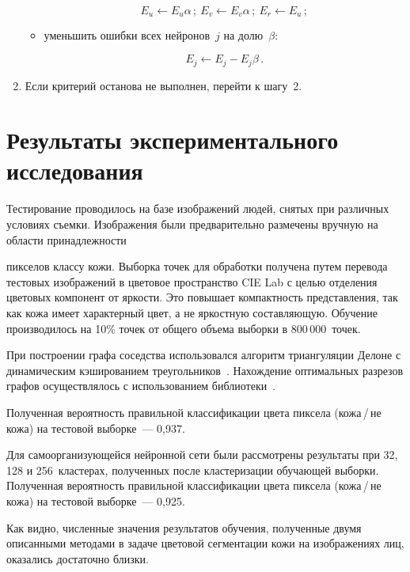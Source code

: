 \begin{multicols}{2}
\begin{enumerate}
\begin{itemize}
\noindent
$$
E_u\leftarrow E_u\alpha\,;\ E_v \leftarrow E_v\alpha\,;\ E_r\leftarrow E_u\,;$$
\item уменьшить ошибки всех нейронов~$j$ на долю~$\beta$:

\noindent
$$
E_j\leftarrow E_j-E_j\beta\,.
$$
      \end{itemize}
\item Если критерий останова не выполнен, перейти к шагу~2.\\[-13pt]
\end{enumerate}

\vspace*{-9pt}

\section{Результаты экспериментального исследования}

      Тестирование проводилось на базе изображений людей, снятых при различных условиях
      съемки. Изображения были предварительно размечены вручную на области принадлежности\linebreak\vspace*{-12pt}
      
      \pagebreak
      
      
      
      \noindent 
пикселов классу кожи. Выборка точек для обработки получена путем перевода тестовых 
изображений в цветовое пространство CIE Lab с целью отделения цветовых компонент от яркости. 
Это повышает компактность представления, так как  кожа имеет характерный цвет, а не 
яркостную составляющую. Обучение производилось на 10\% точек от общего объема выборки в 
800\,000~точек. 
      
      При построении графа соседства использовался алгоритм триангуляции Делоне с 
динамическим кэшированием треугольников~\cite{15v}. Нахождение оптимальных разрезов 
графов осуществлялось с использованием библиотеки~\cite{16v}. 

Полученная вероятность 
правильной классификации цвета пиксела (кожа\,/\,не кожа) на тестовой выборке~--- 0,937.

      Для самоорганизующейся нейронной сети были рассмотрены результаты при 32, 128 и 
256~клас\-те\-рах,  полученных после кластеризации обуча\-ющей выборки. Полученная 
вероятность правильной классификации цвета пиксела (кожа\,/\,не кожа) на тес\-то\-вой выборке~--- 
0,925.

Как видно, численные значения результатов обучения, полученные двумя описанными 
методами в задаче цветовой сегментации кожи на изоб\-ра\-же\-ни\-ях лиц, оказались достаточно 
близки.  %


      \end{multicols}
      
